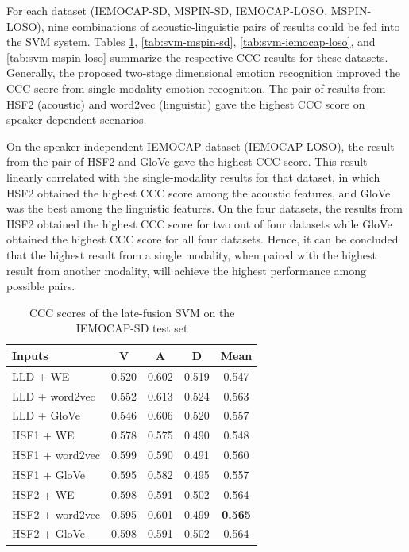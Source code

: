 For each dataset (IEMOCAP-SD, MSPIN-SD, IEMOCAP-LOSO, MSPIN-LOSO), nine
combinations of acoustic-linguistic pairs of results could be fed into the SVM
system.  Tables \ref{tab:svm-iemocap-sd}, \ref{tab:svm-mspin-sd},
\ref{tab:svm-iemocap-loso}, and \ref{tab:svm-mspin-loso} summarize the
respective CCC results for these datasets. Generally, the proposed two-stage
dimensional emotion recognition improved the CCC score from single-modality
emotion recognition. The pair of results from HSF2 (acoustic) and word2vec
(linguistic) gave the highest CCC score on speaker-dependent scenarios.

On the speaker-independent IEMOCAP dataset (IEMOCAP-LOSO), the result from the
pair of HSF2 and GloVe gave the highest CCC score. This result linearly
correlated with the single-modality results for that dataset, in which HSF2
obtained the highest CCC score among the acoustic features, and GloVe was the
best among the linguistic features. On the four datasets, the results from HSF2
obtained the highest CCC score for two out of four datasets while GloVe
obtained the highest CCC score for all four datasets. Hence, it can be
concluded that the highest result from a single modality, when paired with the
highest result from another modality, will achieve the highest performance
among possible pairs.

\begin{table}[htpb]
\caption{CCC scores of the late-fusion SVM on the IEMOCAP-SD test set}
\begin{center}
 \label{tab:svm-iemocap-sd}
 \begin{tabular}{l c c c c}
 \hline
Inputs & V & A & D & Mean \\
\hline \hline
LLD    + WE        & 0.520 & 0.602 & 0.519 & 0.547 \\
LLD    + word2vec  & 0.552 & 0.613 & 0.524 & 0.563 \\
LLD    + GloVe     & 0.546 & 0.606 & 0.520 & 0.557 \\
HSF1   + WE        & 0.578 & 0.575 & 0.490 & 0.548 \\
HSF1   + word2vec  & 0.599 & 0.590 & 0.491 & 0.560 \\
HSF1   + GloVe     & 0.595 & 0.582 & 0.495 & 0.557 \\
HSF2   + WE        & 0.598 & 0.591 & 0.502 & 0.564 \\
HSF2   + word2vec  & 0.595 & 0.601 & 0.499 & \textbf{0.565} \\
HSF2   + GloVe     & 0.598 & 0.591 & 0.502 & 0.564 \\ 
 \hline
 \end{tabular}
\end{center}
\end{table} 

